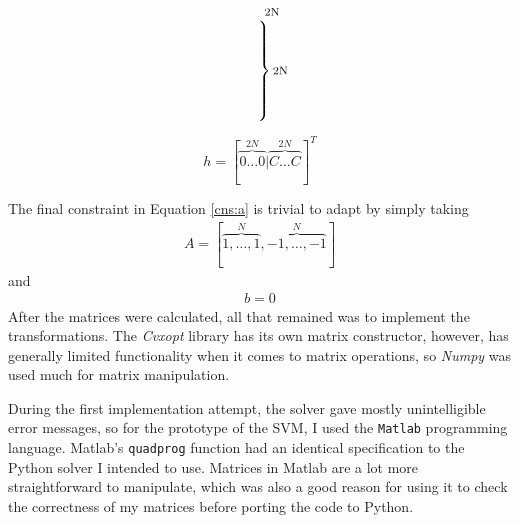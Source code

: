 \documentclass[12pt,a4paper,notitlepage,twoside]{scrbook}
\begin{document}
\[\begin{matrix}
\begin{matrix}
      \text{\footnotesize 2N} \\
        \left.\vphantom{\begin{matrix} 0 \\ 0 \\ 0 \\ 0 \\ 0 \\ 0 \end{matrix}}\right\}
      \text{\footnotesize 2N} 
    \end{matrix}
    \mspace{-33mu}
\end{matrix}
\]


\[h = [\overbrace{0 \dots 0}^{2N}|\overbrace{C \dots C}^{2N}]^T\]

The final constraint in Equation \ref{cns:a} is trivial to adapt by simply taking 
\begin{gather*}
A=[\overbrace{1,\dots,1}^N,\overbrace{-1,\dots,-1}^N]
\end{gather*}
and
\begin{gather*}
b=0
\end{gather*}
After the matrices were calculated, all that remained was to implement the
transformations. The \textit{Cvxopt} library has its own matrix constructor,
however, has generally limited functionality when it comes to matrix
operations, so \textit{Numpy} was used much for matrix manipulation.

During the first implementation attempt, the solver gave mostly unintelligible
error messages, so for the prototype of the SVM, I used the 
\texttt{Matlab} programming language. Matlab's \texttt{quadprog} function had an identical
specification to the Python solver I intended to use.  Matrices in Matlab are a
lot more straightforward to manipulate, which was also a good reason for using it
to check the correctness of my matrices before porting the code to Python.
\end{document}
